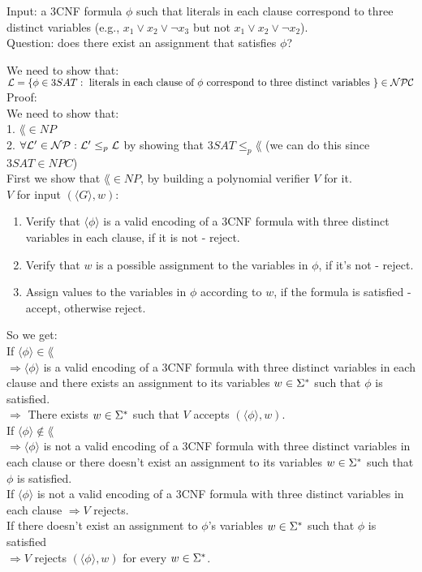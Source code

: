 Input: a 3CNF formula $\phi$ such that literals in each clause correspond
to three distinct variables (e.g., $x_1 \vee x_2 \vee \neg x_3$ but not $x_1 \vee x_2 \vee \neg x_2$). \\
Question: does there exist an assignment that satisfies $\phi$?

We need to show that: \\
$\mathcal{L} = \{\phi \in 3SAT: \text{ literals in each clause of $\phi$ correspond
        to three distinct variables }\} \in \mathcal{N}\mathcal{P}\mathcal{C}$ \\

Proof: \\
We need to show that: \\
1. $\lang \in NP$ \\
2. $\forall \mathcal{L}' \in \mathcal{N}\mathcal{P}: \mathcal{L}' \leq_p \mathcal{L}$ by showing that $3SAT \leq_p \lang$ (we can do this since $3SAT \in NPC$) \\

First we show that $\lang \in NP$, by building a polynomial verifier $V$ for it. \\
$V$ for input $(\langle G \rangle, w)$:
\begin{enumerate}[1., itemsep=5pt]
    \item Verify that $\langle \phi \rangle$ is a valid encoding of a 3CNF formula with three distinct variables in each clause, if it is not - reject.

    \item Verify that $w$ is a possible assignment to the variables in $\phi$, if it's not - reject.

    \item Assign values to the variables in $\phi$ according to $w$, if the formula is satisfied - accept, otherwise reject.

\end{enumerate}

So we get: \\
If $\langle \phi \rangle \in \lang$ \\
$\Rightarrow \langle \phi \rangle$ is a valid encoding of a 3CNF formula with three distinct variables in each clause
and there exists an assignment to its variables $w \in \Sigma^*$ such that $\phi$ is satisfied. \\
$\Rightarrow $ There exists $w \in \Sigma^*$ such that $V$ accepts $(\langle \phi \rangle, w)$. \\

If $\langle \phi \rangle \notin \lang$ \\
$\Rightarrow \langle \phi \rangle$ is not a valid encoding of a 3CNF formula with three distinct variables in each clause
or there doesn't exist an assignment to its variables $w \in \Sigma^*$ such that $\phi$ is satisfied. \\
If $\langle \phi \rangle$ is not a valid encoding of a 3CNF formula with three distinct variables in each clause $\Rightarrow V$ rejects. \\
If there doesn't exist an assignment to $\phi$'s variables $w \in \Sigma^*$ such that $\phi$ is satisfied \\
$\Rightarrow V$ rejects $(\langle \phi \rangle, w)$ for every $w \in \Sigma^*$.

